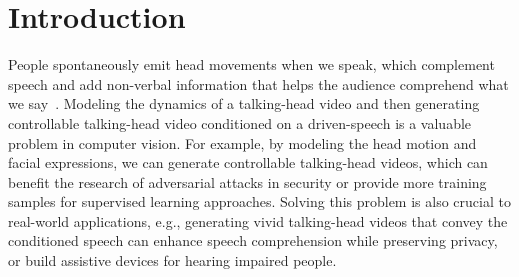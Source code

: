 \documentclass[runningheads]{llncs}
\providecommand{\CXu}[1]{\textcolor{red}{[{\bf #1}]}}
\begin{document}
\section{Introduction}
\label{sec:intro}


People spontaneously emit head movements when we speak, which complement speech and add non-verbal information that helps the audience comprehend what we say~\cite{cassell1999speech,ginosar2019gestures}. Modeling the dynamics of a talking-head video and then generating controllable talking-head video conditioned on a driven-speech is a valuable problem in computer vision. For example, by modeling the head motion and facial expressions, we can generate controllable talking-head videos, which can benefit the research of adversarial attacks in security or provide more training samples for supervised learning approaches. Solving this problem is also crucial to real-world applications, e.g., generating vivid talking-head videos that convey the conditioned speech can enhance speech comprehension while preserving privacy, or build assistive devices for hearing impaired people. 
\end{document}
